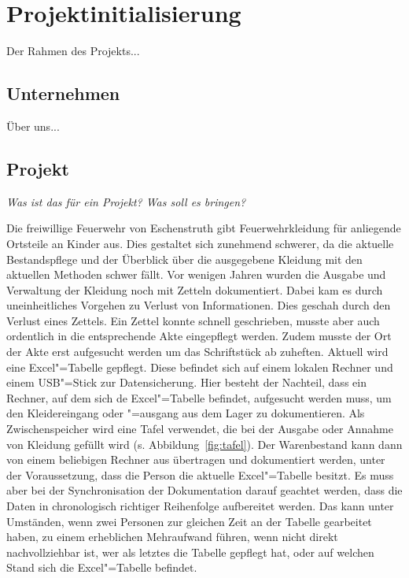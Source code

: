 \section{Projektinitialisierung}\label{sec:Projektinitialisierung}

Der Rahmen des Projekts... 

\subsection{Unternehmen}

Über uns...


\subsection{Projekt}

\textit{Was ist das für ein Projekt? Was soll es bringen? }

Die freiwillige Feuerwehr von Eschenstruth gibt Feuerwehrkleidung für anliegende Ortsteile an Kinder aus. Dies gestaltet sich zunehmend schwerer, da die aktuelle Bestandspflege und der Überblick über die ausgegebene Kleidung mit den aktuellen Methoden schwer fällt. Vor wenigen Jahren wurden die Ausgabe und Verwaltung der Kleidung noch mit Zetteln dokumentiert. Dabei kam es durch uneinheitliches Vorgehen zu Verlust von Informationen. Dies geschah \zb durch den Verlust eines Zettels. Ein Zettel konnte schnell geschrieben, musste aber auch ordentlich in die entsprechende Akte eingepflegt werden. Zudem musste der Ort der Akte erst aufgesucht werden um das Schriftstück ab zuheften. 
Aktuell wird eine Excel"=Tabelle gepflegt. Diese befindet sich auf einem lokalen Rechner und einem USB"=Stick zur Datensicherung. Hier besteht der Nachteil, dass ein Rechner, auf dem sich de Excel"=Tabelle befindet, aufgesucht werden muss, um den Kleidereingang oder "=ausgang aus dem Lager zu dokumentieren. Als Zwischenspeicher wird eine Tafel verwendet, die bei der Ausgabe oder Annahme von Kleidung gefüllt wird (s. Abbildung~\ref{fig:tafel}). Der Warenbestand kann dann von einem beliebigen Rechner aus übertragen und dokumentiert werden, unter der Voraussetzung, dass die Person die aktuelle Excel"=Tabelle besitzt. Es muss aber bei der Synchronisation der Dokumentation darauf geachtet werden, dass die Daten in chronologisch richtiger Reihenfolge aufbereitet werden. Das kann unter Umständen, wenn zwei Personen zur gleichen Zeit an der Tabelle gearbeitet haben, zu einem erheblichen Mehraufwand führen, wenn nicht direkt nachvollziehbar ist, wer als letztes die Tabelle gepflegt hat, oder auf welchen Stand sich die Excel"=Tabelle befindet. 

